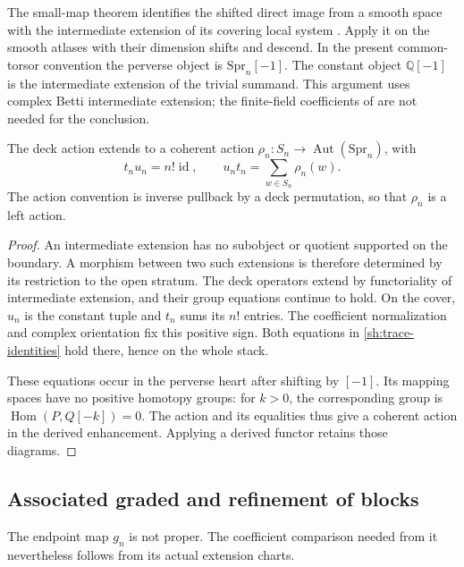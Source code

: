 The small-map theorem identifies the shifted direct image from a
smooth space with the intermediate extension of its covering local
system \cite[\S4.1.14, Remark~9.29, Proposition~9.44]
{deCataldoMigliorini2007}. Apply it on the smooth atlases with
their dimension shifts and descend. In the present common-torsor
convention the perverse object is $\mathrm{Spr}_n[-1]$.
The constant object $\mathbb Q[-1]$ is the intermediate extension
of the trivial summand. This argument uses complex Betti
intermediate extension; the finite-field coefficients of
\cite{FengYunZhang2024} are not needed for the conclusion.

\begin{proposition}\label{sh:springer-trace}
The deck action extends to a coherent action
$\rho_n:S_n\to\operatorname{Aut}(\mathrm{Spr}_n)$, with
\begin{equation}\label{sh:trace-identities}
 t_nu_n=n!\operatorname{id},\qquad
 u_nt_n=\sum_{w\in S_n}\rho_n(w).
\end{equation}
The action convention is inverse pullback by a deck permutation,
so that $\rho_n$ is a left action.
\end{proposition}
\begin{proof}
An intermediate extension has no subobject or quotient supported
on the boundary. A morphism between two such extensions is
therefore determined by its restriction to the open stratum.
The deck operators extend by functoriality of intermediate
extension, and their group equations continue to hold.
On the cover, $u_n$ is the constant tuple and $t_n$ sums its
$n!$ entries. The coefficient normalization and complex
orientation fix this positive sign. Both equations in
\eqref{sh:trace-identities} hold there, hence on the whole stack.

These equations occur in the perverse heart after shifting by
$[-1]$. Its mapping spaces have no positive homotopy groups:
for $k>0$, the corresponding group is
$\operatorname{Hom}(P,Q[-k])=0$. The action and its equalities
thus give a coherent action in the derived enhancement.
Applying a derived functor retains those diagrams.
\end{proof}

\subsection{Associated graded and refinement of blocks}

The endpoint map $g_n$ is not proper. The coefficient comparison
needed from it nevertheless follows from its actual extension
charts.

